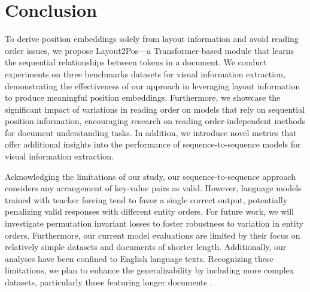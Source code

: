 \section{Conclusion}

To derive position embeddings solely from layout information and avoid reading order issues, we propose Layout2Pos—a Transformer-based module that learns the sequential relationships between tokens in a document. We conduct experiments on three benchmarks datasets for visual information extraction, demonstrating the effectiveness of our approach in leveraging layout information to produce meaningful position embeddings. Furthermore, we showcase the significant impact of variations in reading order on models that rely on sequential position information, encouraging research on reading order-independent methods for document understanding tasks. In addition, we introduce novel metrics that offer additional insights into the performance of sequence-to-sequence models for visual information extraction.

Acknowledging the limitations of our study, our sequence-to-sequence approach considers any arrangement of key-value pairs as valid. However, language models trained with teacher forcing tend to favor a single correct output, potentially penalizing valid responses with different entity orders. For future work, we will investigate permutation invariant losses to foster robustness to variation in entity orders. Furthermore, our current model evaluations are limited by their focus on relatively simple datasets and documents of shorter length. Additionally, our analyses have been confined to English language texts. Recognizing these limitations, we plan to enhance the generalizability by including more complex datasets, particularly those featuring longer documents \citep{gralinski2020kleister}. 
